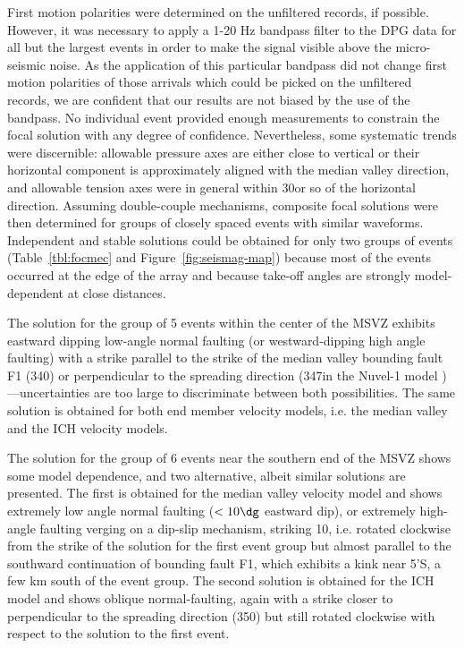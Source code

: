 \documentclass[jgr]{aguplus}
\newlength{\tw}
\begin{document}
\begin{article}
First motion polarities were determined on the unfiltered records, if
possible.  However, it was necessary to apply a 1-20 Hz bandpass
filter to the DPG data for
all but the largest events in order to make the signal visible above
the micro-seismic noise. As the application of this particular bandpass did not
change first motion polarities of those arrivals which could be picked on
the unfiltered records, we are confident that our results are not
biased by the use of the bandpass.
No individual event provided enough measurements to constrain the
focal solution with any degree of confidence. Nevertheless, some
systematic trends were discernible:  allowable pressure
axes are either close to vertical or their horizontal component is approximately aligned with the
median valley direction, and allowable tension axes were in general within
30\dg or so of the horizontal direction.  Assuming double-couple
mechanisms, composite focal solutions
were then determined for groups of closely spaced events with similar
waveforms.   Independent and stable solutions could be obtained for
only two groups of events (Table~\ref{tbl:focmec} and Figure~\ref{fig:seismag-map})
because most of the events occurred at the edge of the array and
because take-off angles are strongly
model-dependent at close distances.

The solution for the group of 5 events within the center of the
MSVZ exhibits eastward dipping low-angle normal
faulting (or westward-dipping high angle faulting)
with a strike parallel to the strike of the median valley bounding
fault F1 (340\dg) or perpendicular to the spreading direction (347\dg in
the Nuvel-1 model \citep{demets90})---uncertainties are too large to
discriminate between both possibilities.
The same solution is obtained for both end member velocity models,
i.e. the median valley and the ICH velocity models.

The solution for the group of 6 events near the southern end of
the MSVZ shows some model dependence, and two alternative, albeit similar
solutions are presented.  The first is obtained for the median valley
velocity model and shows extremely low angle normal faulting ($<10\dg$
eastward dip), or extremely high-angle faulting verging on a dip-slip
mechanism, striking 10\dg, i.e. rotated clockwise from the strike of
the solution for the first event group but almost parallel to the southward continuation
of bounding fault F1, which exhibits a kink near 5'S,  a few km south of the
event group.  The second solution is obtained for the ICH model and
shows oblique normal-faulting, again with a strike closer to
perpendicular to the spreading direction (350\dg) but still rotated
clockwise with respect to the  solution to the first event.


\end{article}
\end{document}
